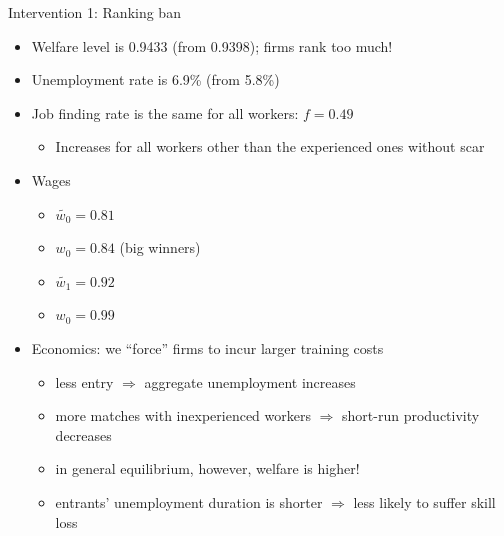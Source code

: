 \documentclass[9pt,xcolor={svgnames}]{beamer}
\begin{document}
\begin{frame}{Intervention 1: Ranking ban}
\begin{itemize}
\setlength\itemsep{1.5em}

\item Welfare level is 0.9433 (from 0.9398); firms rank too much!

\item Unemployment rate is 6.9\% (from 5.8\%)
    
\item Job finding rate is the same for all workers: $f = 0.49$
\smallskip
    \begin{itemize}
        \item Increases for all workers other than the experienced ones without scar
    \end{itemize}

\item Wages
    \smallskip
    \begin{itemize}
        \item $\tilde{w_{0}} = 0.81$ 
        \item $w_{0} = 0.84$ (big winners)
        \item $\tilde{w_{1}} = 0.92$ 
        \item $w_{0} = 0.99$
    \end{itemize}

    \item Economics: we ``force'' firms to incur larger training costs
    \smallskip
    \begin{itemize}
        \item less entry $\Rightarrow$ aggregate unemployment increases 
        \item more matches with inexperienced workers $\Rightarrow$ short-run productivity decreases 
        \item in general equilibrium, however, welfare is higher!
        \item entrants' unemployment duration is shorter $\Rightarrow$ less likely to suffer skill loss
    \end{itemize}
        
\end{itemize}
 
\end{frame}
\end{document}
